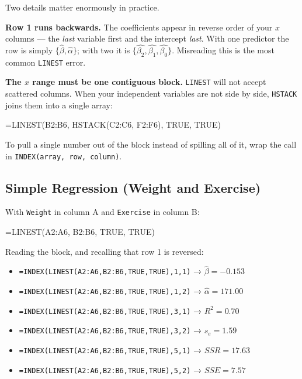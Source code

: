 \documentclass[
  11pt,
  letterpaper,
  DIV=11,
  numbers=noendperiod,
  oneside,
  open=any]{scrreprt}
\newenvironment{Shaded}{\begin{snugshade}}{\end{snugshade}}
\newcommand{\NormalTok}[1]{\textcolor[rgb]{0.00,0.23,0.31}{#1}}
\providecommand{\tightlist}{%
  \setlength{\itemsep}{0pt}\setlength{\parskip}{0pt}}\usepackage{longtable,booktabs,array}
\begin{document}
Two details matter enormously in practice.

\textbf{Row 1 runs backwards.} The coefficients appear in reverse order
of your \(x\) columns --- the \emph{last} variable first and the
intercept \emph{last}. With one predictor the row is simply
\(\{\hat{\beta}, \hat{\alpha}\}\); with two it is
\(\{\hat{\beta_2}, \hat{\beta_1}, \hat{\beta_0}\}\). Misreading this is
the most common \texttt{LINEST} error.

\textbf{The \(x\) range must be one contiguous block.} \texttt{LINEST}
will not accept scattered columns. When your independent variables are
not side by side, \texttt{HSTACK} joins them into a single array:

\begin{Shaded}
\begin{Highlighting}[]
\NormalTok{=LINEST(B2:B6, HSTACK(C2:C6, F2:F6), TRUE, TRUE)}
\end{Highlighting}
\end{Shaded}

To pull a single number out of the block instead of spilling all of it,
wrap the call in \texttt{INDEX(array,\ row,\ column)}.

\subsection*{Simple Regression (Weight and
Exercise)}\label{simple-regression-weight-and-exercise}

With \texttt{Weight} in column A and \texttt{Exercise} in column B:

\begin{Shaded}
\begin{Highlighting}[]
\NormalTok{=LINEST(A2:A6, B2:B6, TRUE, TRUE)}
\end{Highlighting}
\end{Shaded}

Reading the block, and recalling that row 1 is reversed:

\begin{itemize}
\tightlist
\item
  \texttt{=INDEX(LINEST(A2:A6,B2:B6,TRUE,TRUE),1,1)} →
  \(\hat{\beta}=-0.153\)
\item
  \texttt{=INDEX(LINEST(A2:A6,B2:B6,TRUE,TRUE),1,2)} →
  \(\hat{\alpha}=171.00\)
\item
  \texttt{=INDEX(LINEST(A2:A6,B2:B6,TRUE,TRUE),3,1)} → \(R^2=0.70\)
\item
  \texttt{=INDEX(LINEST(A2:A6,B2:B6,TRUE,TRUE),3,2)} → \(s_e=1.59\)
\item
  \texttt{=INDEX(LINEST(A2:A6,B2:B6,TRUE,TRUE),5,1)} → \(SSR=17.63\)
\item
  \texttt{=INDEX(LINEST(A2:A6,B2:B6,TRUE,TRUE),5,2)} → \(SSE=7.57\)
\end{itemize}
\end{document}
